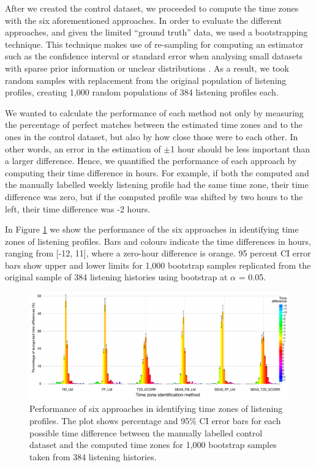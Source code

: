 After we created the control dataset, we proceeded to compute the time zones with the six aforementioned approaches. In order to evaluate the different approaches, and given the limited ``ground truth'' data, we used a bootstrapping technique. This technique makes use of re-sampling for computing an estimator such as the confidence interval or standard error when analysing small datasets with sparse prior information or unclear distributions \autocite{henderson05bootstrap}.
As a result, we took random samples with replacement from the original population of listening profiles, creating 1,000 random populations of 384 listening profiles each. 

We wanted to calculate the performance of each method not only by measuring the percentage of perfect matches between the estimated time zones and to the ones in the control dataset, but also by how close those were to each other. In other words, an error in the estimation of $\pm$1 hour should be less important than a larger difference. Hence, we quantified the performance of each approach by computing their time difference in hours. For example, if both the computed and the manually labelled weekly listening profile had the same time zone, their time difference was zero, but if the computed profile was shifted by two hours to the left, their time difference was -2 hours.



In Figure \ref{fig:1000pop_6met_mn_sd_24timediff} we show the performance of the six approaches in identifying time zones of listening profiles. 
Bars and colours indicate the time differences in hours, ranging from [-12, 11], where a zero-hour difference is orange. 95 percent CI error bars show upper and lower limits for 1,000 bootstrap samples replicated from the original sample of 384 listening histories using bootstrap at $\alpha$ = 0.05. 


\begin{figure}[!h]
\centering
\includegraphics[width=1.0\textwidth]{1000_pops_6_methods_per_24_timediff_PRINT.pdf}				
\caption[Performance of six approaches for time-zone normalisation]{Performance of six approaches in identifying time zones of listening profiles. The plot shows percentage and 95\% CI error bars for each possible time difference between the manually labelled control dataset and the computed time zones for 1,000 bootstrap samples taken from 384 listening histories.}
\label{fig:1000pop_6met_mn_sd_24timediff}
\end{figure}






